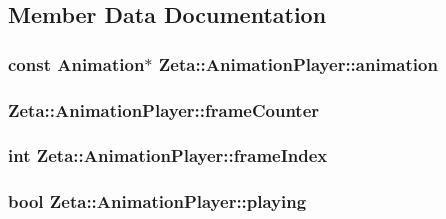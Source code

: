 \subsection{Member Data Documentation}
\hypertarget{classZeta_1_1AnimationPlayer_a4b97c373a921a0ea6a67c5371f346ddf}{
\subsubsection[{animation}]{\setlength{\rightskip}{0pt plus 5cm}const {\bf Animation}$\ast$ Zeta\+::\+Animation\+Player\+::animation\hspace{0.3cm}{\ttfamily [private]}}}\label{classZeta_1_1AnimationPlayer_a4b97c373a921a0ea6a67c5371f346ddf}
\hypertarget{classZeta_1_1AnimationPlayer_a9976b8e6d0bb822f289fa5caaf1de8c9}{
\subsubsection[{frame\+Counter}]{ Zeta\+::\+Animation\+Player\+::frame\+Counter\hspace{0.3cm}{\ttfamily [private]}}}\label{classZeta_1_1AnimationPlayer_a9976b8e6d0bb822f289fa5caaf1de8c9}
\hypertarget{classZeta_1_1AnimationPlayer_a18cdb164a09c132e5d94d20e65d0ee97}{
\subsubsection[{frame\+Index}]{\setlength{\rightskip}{0pt plus 5cm}int Zeta\+::\+Animation\+Player\+::frame\+Index\hspace{0.3cm}{\ttfamily [private]}}}\label{classZeta_1_1AnimationPlayer_a18cdb164a09c132e5d94d20e65d0ee97}
\hypertarget{classZeta_1_1AnimationPlayer_a0f2b6832532d76d52acff90e31b27f15}{
\subsubsection[{playing}]{\setlength{\rightskip}{0pt plus 5cm}bool Zeta\+::\+Animation\+Player\+::playing\hspace{0.3cm}{\ttfamily [private]}}}\label{classZeta_1_1AnimationPlayer_a0f2b6832532d76d52acff90e31b27f15}
